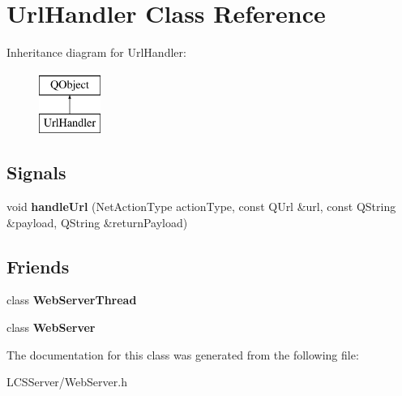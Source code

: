\hypertarget{class_url_handler}{}\section{Url\+Handler Class Reference}
\label{class_url_handler}
Inheritance diagram for Url\+Handler\+:\begin{figure}[H]
\begin{center}
\leavevmode
\includegraphics[height=2.000000cm]{class_url_handler}
\end{center}
\end{figure}
\subsection*{Signals}
\begin{DoxyCompactItemize}
\item 
\mbox{\label{class_url_handler_a32494543aed2bc60d7adb2eefbe18355}} 
void {\bfseries handle\+Url} (Net\+Action\+Type action\+Type, const Q\+Url \&url, const Q\+String \&payload, Q\+String \&return\+Payload)
\end{DoxyCompactItemize}
\subsection*{Friends}
\begin{DoxyCompactItemize}
\item 
\mbox{\label{class_url_handler_a5768018dafdb551ec44bf0e89e3e665b}} 
class {\bfseries Web\+Server\+Thread}
\item 
\mbox{\label{class_url_handler_abdf165e971bc8503e8fcdb3267df5a36}} 
class {\bfseries Web\+Server}
\end{DoxyCompactItemize}


The documentation for this class was generated from the following file\+:\begin{DoxyCompactItemize}
\item 
L\+C\+S\+Server/Web\+Server.\+h\end{DoxyCompactItemize}
